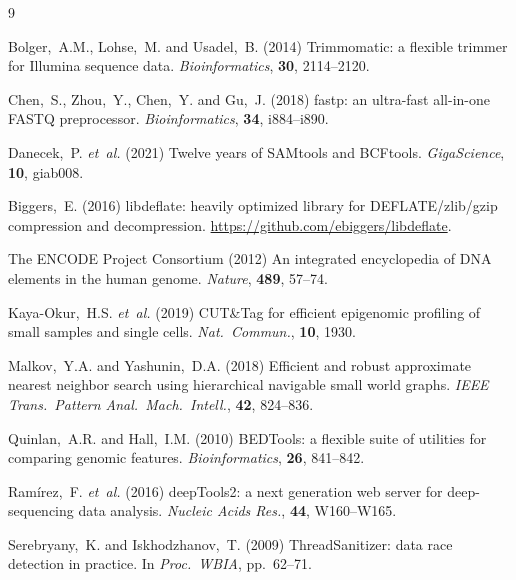 \documentclass[10pt,twocolumn]{article}
\begin{document}
\begin{thebibliography}{9}
\small

Bolger,~A.M., Lohse,~M. and Usadel,~B. (2014)
Trimmomatic: a flexible trimmer for Illumina sequence data.
\textit{Bioinformatics}, \textbf{30}, 2114--2120.

Chen,~S., Zhou,~Y., Chen,~Y. and Gu,~J. (2018)
fastp: an ultra-fast all-in-one FASTQ preprocessor.
\textit{Bioinformatics}, \textbf{34}, i884--i890.

Danecek,~P. \textit{et~al.} (2021)
Twelve years of SAMtools and BCFtools.
\textit{GigaScience}, \textbf{10}, giab008.

Biggers,~E. (2016) libdeflate: heavily optimized library for DEFLATE/zlib/gzip
compression and decompression. \url{https://github.com/ebiggers/libdeflate}.

The ENCODE Project Consortium (2012)
An integrated encyclopedia of DNA elements in the human genome.
\textit{Nature}, \textbf{489}, 57--74.

Kaya-Okur,~H.S. \textit{et~al.} (2019)
CUT\&Tag for efficient epigenomic profiling of small samples and single cells.
\textit{Nat.\ Commun.}, \textbf{10}, 1930.

Malkov,~Y.A. and Yashunin,~D.A. (2018)
Efficient and robust approximate nearest neighbor search using hierarchical
navigable small world graphs.
\textit{IEEE Trans.\ Pattern Anal.\ Mach.\ Intell.}, \textbf{42}, 824--836.

Quinlan,~A.R. and Hall,~I.M. (2010)
BEDTools: a flexible suite of utilities for comparing genomic features.
\textit{Bioinformatics}, \textbf{26}, 841--842.

Ram\'irez,~F. \textit{et~al.} (2016)
deepTools2: a next generation web server for deep-sequencing data analysis.
\textit{Nucleic Acids Res.}, \textbf{44}, W160--W165.

Serebryany,~K. and Iskhodzhanov,~T. (2009)
ThreadSanitizer: data race detection in practice.
In \textit{Proc.\ WBIA}, pp.\ 62--71.


\end{thebibliography}
\end{document}
